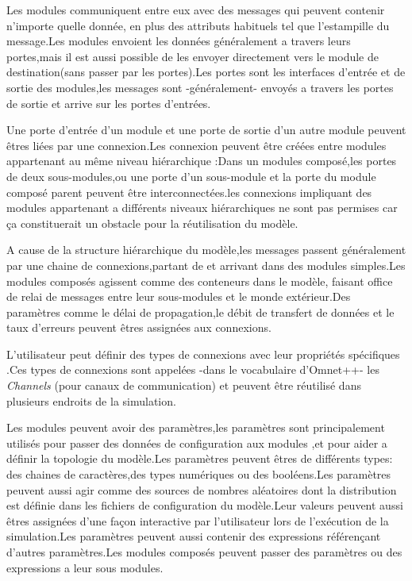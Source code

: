 					
Les modules communiquent entre eux  avec des messages qui peuvent contenir n'importe quelle donnée, en plus des attributs habituels tel que l'estampille du message.Les modules envoient les données généralement a travers leurs  portes,mais il est aussi possible de les envoyer directement vers le module de destination(sans passer par les portes).Les portes sont les interfaces d'entrée et de sortie des modules,les messages sont -généralement- envoyés a travers les portes de sortie et arrive sur les portes d'entrées.

Une porte d'entrée d'un module et une porte de sortie d'un autre module peuvent êtres liées par une connexion.Les connexion peuvent être créées entre modules appartenant au même niveau hiérarchique :Dans un modules composé,les portes de deux sous-modules,ou une porte d'un sous-module et la porte du module composé parent peuvent être interconnectées.les connexions impliquant des modules appartenant a différents niveaux hiérarchiques ne sont pas permises car ça constituerait un obstacle pour la réutilisation du modèle.

A cause de la structure hiérarchique du modèle,les messages passent généralement par une chaine de connexions,partant de et arrivant dans des modules simples.Les modules composés agissent comme des conteneurs dans le modèle, faisant office de relai de messages entre leur sous-modules et le monde extérieur.Des paramètres comme le délai de propagation,le débit de transfert de données et le taux d'erreurs peuvent êtres assignées aux connexions.

L'utilisateur peut définir des types de connexions avec leur propriétés spécifiques .Ces types de connexions sont appelées -dans le vocabulaire d'Omnet++- les \emph{Channels} (pour canaux de communication)  et peuvent être réutilisé dans plusieurs endroits de la simulation.

Les modules peuvent avoir des paramètres,les paramètres sont principalement utilisés pour passer des données de configuration aux modules ,et pour aider a définir la topologie du modèle.Les paramètres peuvent êtres  de différents types: des chaines de caractères,des types numériques ou des booléens.Les paramètres peuvent aussi agir comme des sources de nombres aléatoires dont la distribution est définie dans les fichiers de configuration du modèle.Leur valeurs peuvent aussi êtres assignées d'une façon interactive par l'utilisateur lors de l'exécution de la simulation.Les paramètres peuvent aussi contenir des expressions référençant d'autres paramètres.Les modules composés peuvent passer des paramètres ou des expressions a leur sous modules.

